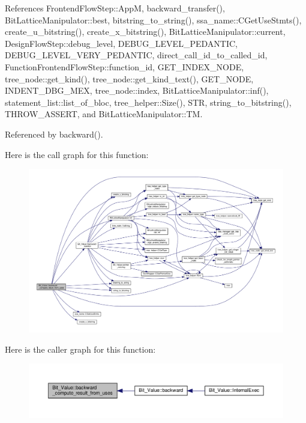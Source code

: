 References Frontend\+Flow\+Step\+::\+AppM, backward\+\_\+transfer(), Bit\+Lattice\+Manipulator\+::best, bitstring\+\_\+to\+\_\+string(), ssa\+\_\+name\+::\+C\+Get\+Use\+Stmts(), create\+\_\+u\+\_\+bitstring(), create\+\_\+x\+\_\+bitstring(), Bit\+Lattice\+Manipulator\+::current, Design\+Flow\+Step\+::debug\+\_\+level, D\+E\+B\+U\+G\+\_\+\+L\+E\+V\+E\+L\+\_\+\+P\+E\+D\+A\+N\+T\+IC, D\+E\+B\+U\+G\+\_\+\+L\+E\+V\+E\+L\+\_\+\+V\+E\+R\+Y\+\_\+\+P\+E\+D\+A\+N\+T\+IC, direct\+\_\+call\+\_\+id\+\_\+to\+\_\+called\+\_\+id, Function\+Frontend\+Flow\+Step\+::function\+\_\+id, G\+E\+T\+\_\+\+I\+N\+D\+E\+X\+\_\+\+N\+O\+DE, tree\+\_\+node\+::get\+\_\+kind(), tree\+\_\+node\+::get\+\_\+kind\+\_\+text(), G\+E\+T\+\_\+\+N\+O\+DE, I\+N\+D\+E\+N\+T\+\_\+\+D\+B\+G\+\_\+\+M\+EX, tree\+\_\+node\+::index, Bit\+Lattice\+Manipulator\+::inf(), statement\+\_\+list\+::list\+\_\+of\+\_\+bloc, tree\+\_\+helper\+::\+Size(), S\+TR, string\+\_\+to\+\_\+bitstring(), T\+H\+R\+O\+W\+\_\+\+A\+S\+S\+E\+RT, and Bit\+Lattice\+Manipulator\+::\+TM.



Referenced by backward().

Here is the call graph for this function\+:
\nopagebreak
\begin{figure}[H]
\begin{center}
\leavevmode
\includegraphics[width=350pt]{df/d4b/classBit__Value_ad2b5f1be449648c702b1cfe905c6f7ab_cgraph}
\end{center}
\end{figure}
Here is the caller graph for this function\+:
\nopagebreak
\begin{figure}[H]
\begin{center}
\leavevmode
\includegraphics[width=350pt]{df/d4b/classBit__Value_ad2b5f1be449648c702b1cfe905c6f7ab_icgraph}
\end{center}
\end{figure}
\mbox{\label{classBit__Value_aec80afe9154981787b03d1a8c48df061}} 
